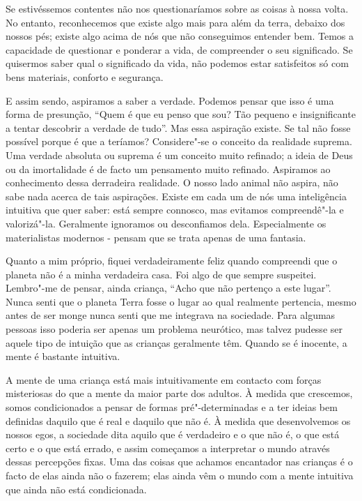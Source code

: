 Se estivéssemos contentes não nos questionaríamos sobre as coisas à nossa volta.
No entanto, reconhecemos que existe algo mais para além da terra, debaixo dos
nossos pés; existe algo acima de nós que não conseguimos entender bem. Temos a
capacidade de questionar e ponderar a vida, de compreender o seu significado. Se
quisermos saber qual o significado da vida, não podemos estar satisfeitos só com
bens materiais, conforto e segurança.

E assim sendo, aspiramos a saber a verdade. Podemos pensar que isso é uma forma
de presunção, “Quem é que eu penso que sou? Tão pequeno e insignificante a
tentar descobrir a verdade de tudo”. Mas essa aspiração existe. Se tal não fosse
possível porque é que a teríamos? Considere"-se o conceito da realidade suprema.
Uma verdade absoluta ou suprema é um conceito muito refinado; a ideia de Deus ou
da imortalidade é de facto um pensamento muito refinado. Aspiramos ao
conhecimento dessa derradeira realidade. O nosso lado animal não aspira, não
sabe nada acerca de tais aspirações. Existe em cada um de nós uma inteligência
intuitiva que quer saber: está sempre connosco, mas evitamos compreendê"-la e
valorizá"-la. Geralmente ignoramos ou desconfiamos dela. Especialmente os
materialistas modernos - pensam que se trata apenas de uma fantasia.

Quanto a mim próprio, fiquei verdadeiramente feliz quando compreendi que o
planeta não é a minha verdadeira casa. Foi algo de que sempre suspeitei.
Lembro"-me de pensar, ainda criança, “Acho que não pertenço a este lugar”. Nunca
senti que o planeta Terra fosse o lugar ao qual realmente pertencia, mesmo
antes de ser monge nunca senti que me integrava na sociedade. Para algumas
pessoas isso poderia ser apenas um problema neurótico, mas talvez pudesse ser
aquele tipo de intuição que as crianças geralmente têm. Quando se é inocente, a
mente é bastante intuitiva.

A mente de uma criança está mais intuitivamente em
contacto com forças misteriosas do que a mente da maior parte dos adultos. À
medida que crescemos, somos condicionados a pensar de formas pré"-determinadas e
a ter ideias bem definidas daquilo que é real e daquilo que não é. À medida que
desenvolvemos os nossos egos, a sociedade dita aquilo que é verdadeiro e o que
não é, o que está certo e o que está errado, e assim começamos a interpretar o
mundo através dessas percepções fixas. Uma das coisas que achamos encantador nas
crianças é o facto de elas ainda não o fazerem; elas ainda vêm o mundo com a
mente intuitiva que ainda não está condicionada.

